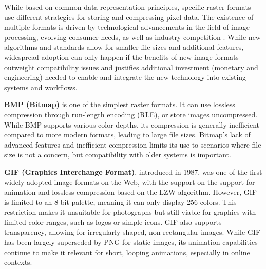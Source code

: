 

While based on common data representation principles, specific raster formats use different strategies for storing and compressing pixel data. The existence of multiple formats is driven by technological advancements in the field of image processing, evolving consumer needs, as well as industry competition \cite{murray1994encyclopedia}. While new algorithms and standards allow for smaller file sizes and additional features, widespread adoption can only happen if the benefits of new image formats outweight compatibility issues and justifies additional investment (monetary and engineering) needed to enable and integrate the new technology into existing systems and workflows.


\textbf{BMP (Bitmap)} is one of the simplest raster formats. It can use lossless compression through run-length encoding (RLE), or store images uncompressed. While BMP supports various color depths, its compression is generally inefficient compared to more modern formats, leading to large file sizes. Bitmap's lack of advanced features and inefficient compression limits its use to scenarios where file size is not a concern, but compatibility with older systems is important.

\textbf{GIF (Graphics Interchange Format)}, introduced in 1987, was one of the first widely-adopted image formats on the Web, with the support on the support for animation and lossless compression based on the LZW algorithm. However, GIF is limited to an 8-bit palette, meaning it can only display 256 colors. This restriction makes it unsuitable for photographs but still viable for graphics with limited color ranges, such as logos or simple icons. GIF also supports transparency, allowing for irregularly shaped, non-rectangular images. While GIF has been largely superseded by PNG for static images, its animation capabilities continue to make it relevant for short, looping animations, especially in online contexts.


